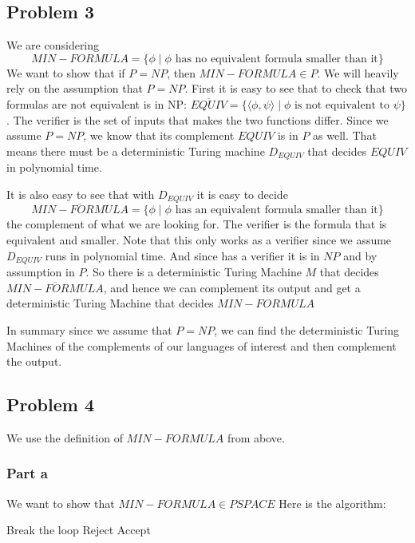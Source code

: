 \documentclass[english]{article}
\begin{document}
\subsection*{Problem 3}
We are considering 
\[ MIN-FORMULA = \{ \phi \mid \phi \textrm{ has no equivalent formula smaller than it}\} \]
We want to show that if $P = NP$, then $MIN-FORMULA \in P$.
We will heavily rely on the assumption that $P = NP$. First it is easy to see that to check that two formulas are
not equivalent is in NP: $\overline{EQUIV} =
\{ \langle \phi, \psi \rangle \mid \phi \textrm{ is not equivalent to }\psi \}$. The verifier is the set of inputs
that makes the two functions differ. Since we assume $P = NP$, we know that its complement $EQUIV$ is in $P$ as well. 
That means there must be a deterministic Turing machine $D_{EQUIV}$ that decides $EQUIV$ in polynomial time.

It is also easy to see that with $D_{EQUIV}$ it is easy to decide
\[ \overline{MIN-FORMULA} = \{ \phi \mid \phi \textrm{ has an equivalent formula smaller than it}\} \]
the complement
of what we are looking for. The verifier is the formula that is equivalent and smaller. Note that this only works as
a verifier since we assume $D_{EQUIV}$ runs in polynomial time. And since has a verifier it is in $NP$ and by 
assumption in $P$. So there is a deterministic Turing Machine $M$ that decides $\overline{MIN-FORMULA}$, and hence
we can complement its output and get a deterministic Turing Machine that decides ${MIN-FORMULA}$

In summary since we assume that $P = NP$, we can find the deterministic Turing Machines of the complements of our
languages of interest and then complement the output.

\subsection*{Problem 4}
We use the definition of $MIN-FORMULA$ from above.
\subsubsection{Part a}
We want to show that $MIN-FORMULA \in PSPACE$
Here is the algorithm:

\begin{algorithmic}
        \State Break the loop
      \EndIf
    \EndFor
      \State Reject
    \EndIf
  \EndFor
  \State Accept
\EndFunction 
\end{algorithmic}
\end{document}
